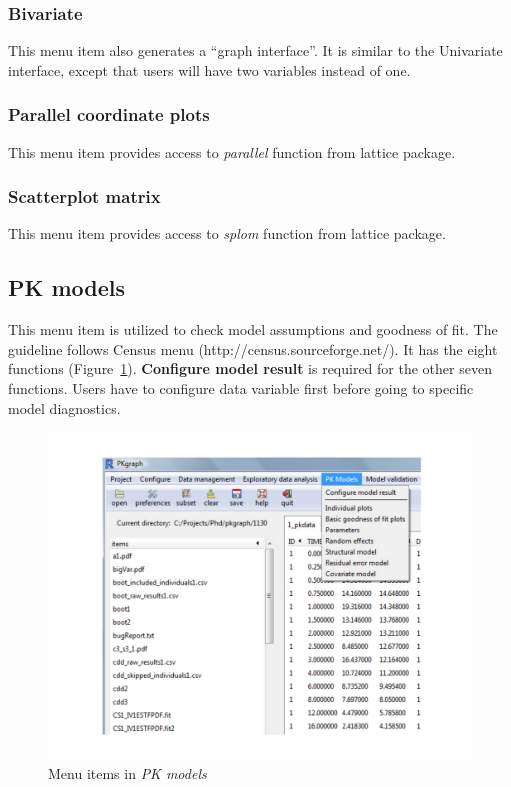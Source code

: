\documentclass[a4paper]{article}
\begin{document}
\subsubsection{Bivariate}
This menu item also generates a ``graph interface''. It is similar to the Univariate interface, except that users will have two variables instead of one.
\subsubsection{Parallel coordinate plots}
This menu item provides access to \textit{parallel} function from lattice package.
\subsubsection{Scatterplot matrix}
This menu item provides access to \textit{splom} function from lattice package.
\subsection{PK models}
This menu item is utilized to check model assumptions and goodness of fit. The guideline follows Census menu (http://census.sourceforge.net/). It has the eight functions (Figure~\ref{pkmodel}). \textbf{ Configure model result} is required for the other seven functions. 
Users have to configure data variable first before going to specific model diagnostics.
\begin{figure}[h!tb] \centering
\includegraphics[scale=0.6]{pkmodel.pdf}
\caption{Menu items in \textit{PK models}}
\label{pkmodel}
\end{figure}
\end{document}
